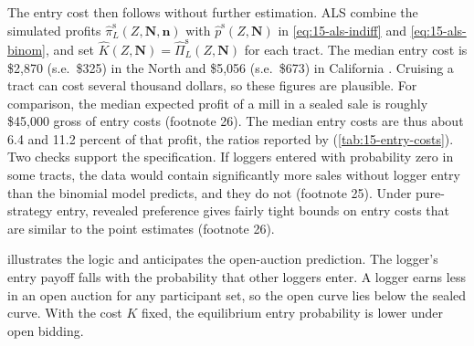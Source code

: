 The entry cost then follows without further estimation. ALS combine the simulated profits
$\hat\pi^{\mathrm s}_L(Z,\bm N,\bm n)$ with $\hat p^{\mathrm s}(Z,\bm N)$ in
\eqref{eq:15-als-indiff} and \eqref{eq:15-als-binom}, and set $\hat K(Z,\bm N)=\hat\Pi^{\mathrm s}_L(Z,\bm N)$ for each
tract. The median entry cost is \$2,870 (s.e.\ \$325) in the North and \$5,056 (s.e.\ \$673) in California
\citep[p.~246]{AtheyLevinSeira2011}. Cruising a tract can cost several thousand dollars, so these figures
are plausible. For comparison, the median expected profit of a mill in a sealed sale is roughly \$45,000
gross of entry costs (footnote 26). The median entry costs are thus about 6.4 and 11.2 percent of that
profit, the ratios reported by \citet[p.~91]{HortacsuPerrigne2021} (\cref{tab:15-entry-costs}). Two checks support the specification. If loggers entered with
probability zero in some tracts, the data would contain significantly more sales without logger entry than
the binomial model predicts, and they do not (footnote 25). Under pure-strategy entry, revealed preference
gives fairly tight bounds on entry costs that are similar to the point estimates (footnote 26).

 illustrates the logic and anticipates the open-auction prediction. The logger's
entry payoff falls with the probability that other loggers enter. A logger earns less in an open auction
for any participant set, so the open curve lies below the sealed curve. With the cost $K$ fixed, the
equilibrium entry probability is lower under open bidding.

